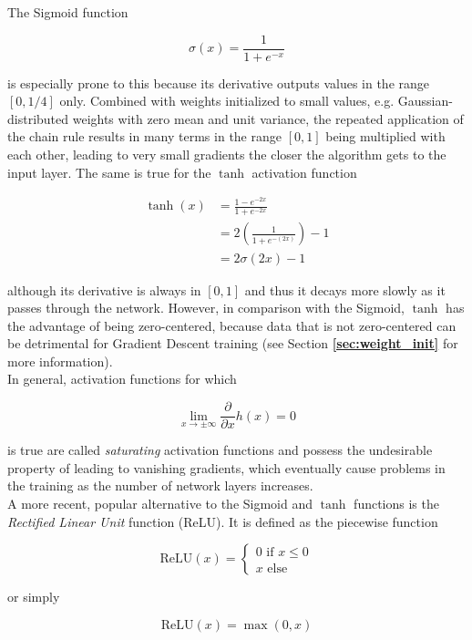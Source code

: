 The Sigmoid function

\[ \sigma(x) = \frac{1}{1 + e^{-x}} \]

\noindent is especially prone to this because its derivative outputs values in the range $\left [0, 1/4 \right ]$ only. Combined with weights initialized to small values, e.g. Gaussian-distributed weights with zero mean and unit variance, the repeated application of the chain rule results in many terms in the range $\left [0, 1\right ]$ being multiplied with each other, leading to very small gradients the closer the algorithm gets to the input layer. The same is true for the $\tanh$ activation function

\begin {align}
	\tanh(x) &= \frac{1 - e^{-2x}}{1 + e^{-2x}}\\
		  &= 2 \left ( \frac{1}{1 + e^{-(2x)}} \right ) - 1\\
		  &= 2 \sigma(2x) - 1
\end {align}

\noindent although its derivative is always in $[0, 1]$ and thus it decays more slowly as it passes through the network. However, in comparison with the Sigmoid, $\tanh$ has the advantage of being zero-centered, because data that is not zero-centered can be detrimental for Gradient Descent training (see Section \textbf{\ref{sec:weight_init}} for more information).\\

In general, activation functions for which

\[ \lim \limits_{x \rightarrow \pm \infty} \frac{\partial}{\partial x} h(x) = 0 \label{eq:saturation} \]

\noindent is true are called \textit{saturating} activation functions and possess the undesirable property of leading to vanishing gradients, which eventually cause problems in the training as the number of network layers increases.\\ 

\noindent A more recent, popular alternative to the Sigmoid and $\tanh$ functions is the \textit{Rectified Linear Unit} function (ReLU). It is defined as the piecewise function

\[  \text{ReLU}(x) = \begin{cases}
			0 \text{ if } x \leq 0\\
			x \text{ else}
		 \end{cases}
\] 

\noindent or simply

\[ \text{ReLU}(x) = \max(0, x) \]

